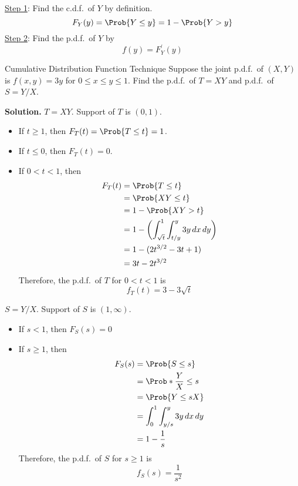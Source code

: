 \underline{Step 1}: Find the c.d.f.\ of $ Y $ by definition.
\[ F_Y(y)=\Prob{Y\le y}=1-\Prob{Y>y} \]
\underline{Step 2}: Find the p.d.f.\ of $ Y $ by
\[ f(y)=F^\prime_Y(y) \]
\begin{Example}{Cumulative Distribution Function Technique}{}
    Suppose the joint p.d.f.\ of $ (X,Y) $ is $ f(x,y)=3y $
    for $ 0\le x\le y\le 1 $. Find the p.d.f.\
    of $ T=XY $ and p.d.f.\ of $ S=Y/X $.

    \textbf{Solution.} $ T=XY $. Support of $ T $ is $ (0,1) $.
    \begin{itemize}
        \item If $ t\ge 1 $, then $ F_T(t)=\Prob{T\le t}=1 $.
        \item If $ t\le 0 $, then $ F_T(t)=0 $.
        \item If $ 0<t<1 $, then
              \begin{align*}
                  F_T(t)
                   & =\Prob{T\le t}                                                         \\
                   & =\Prob{XY\le t}                                                        \\
                   & =1-\Prob{XY>t}                                                         \\
                   & =1-\biggl(\int_{\sqrt{t}}^{1} \int_{t/y}^{y} 3y\, d{x} \, d{y} \biggr) \\
                   & =1-(2t^{3/2}-3t+1)                                                     \\
                   & =3t-2t^{3/2}
              \end{align*}
              Therefore, the p.d.f.\ of $ T $ for $ 0<t<1 $ is
              \[ f_T(t)=3-3\sqrt{t} \]
    \end{itemize}
    $ S=Y/X $. Support of $ S $ is $ (1,\infty) $.
    \begin{itemize}
        \item If $ s<1 $, then $ F_S(s)=0 $
        \item If $ s\ge 1 $, then
              \begin{align*}
                  F_S(s)
                   & =\Prob{S\le s}                                 \\
                   & =\Prob*{\frac{Y}{X}\le s}                      \\
                   & =\Prob{Y\le sX}                                \\
                   & =\int_{0}^{1} \int_{y/s}^{y} 3y\, d{x} \, d{y} \\
                   & =1-\frac{1}{s}
              \end{align*}
              Therefore, the p.d.f.\ of $ S $ for $ s\ge 1 $ is
              \[ f_S(s)=\frac{1}{s^2} \]
    \end{itemize}
\end{Example}
